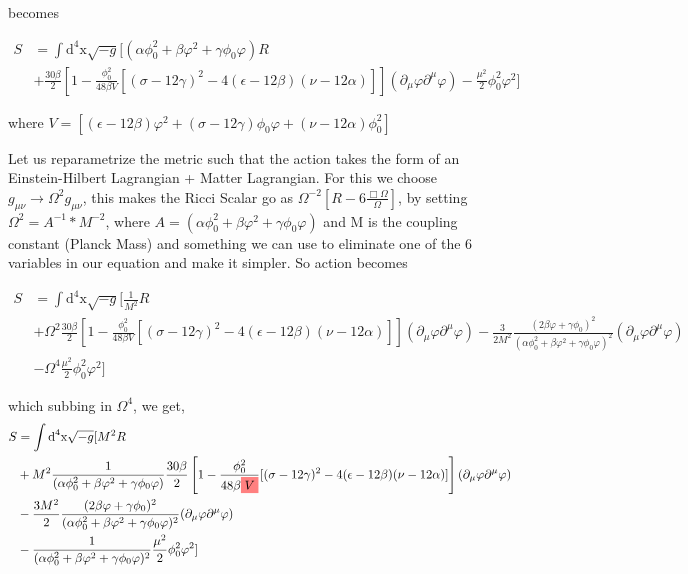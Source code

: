 \documentclass{article}
\newcommand{\highlight}[1]{%
  \colorbox{red!50}{$\displaystyle#1$}}
\begin{document}
becomes

\begin{equation} \label{24}
    \begin{aligned}
        S &= \int \text{d}^4\text{x} \sqrt{-g} [ (\alpha \phi^2_0 + \beta \varphi^2 + \gamma \phi_0 \varphi) R \\
        &+ \frac{30 \beta}{2} \left[ 1 - \frac{\phi_0^2}{48\beta V} [(\sigma - 12\gamma)^2 - 4(\epsilon - 12 \beta)(\nu - 12\alpha) ] \right] (\partial_\mu \varphi \partial^\mu \varphi)- \frac{\mu^2}{2} \phi^2_0 \varphi^2 ] 
    \end{aligned}
\end{equation}

where $V = [(\epsilon - 12\beta) \varphi^2 + (\sigma - 12\gamma) \phi_0 \varphi + (\nu - 12\alpha)\phi^2_0]$

Let us reparametrize the metric such that the action takes the form of an Einstein-Hilbert Lagrangian + Matter Lagrangian. For this we choose $g_{\mu\nu} \rightarrow \Omega^2 g_{\mu\nu} $, this makes the  Ricci Scalar go as $\Omega^{-2} [R - 6\frac{\Box\Omega}{\Omega}]$, by setting $\Omega^2 = A^{-1} * M^{-2}$, where $A = (\alpha \phi^2_0 + \beta \varphi^2 + \gamma \phi_0 \varphi)$ and M is the coupling constant (Planck Mass) and something we can use to eliminate one of the 6 variables in our equation and make it simpler. So action becomes

\begin{equation}
    \begin{aligned}
        S &= \int \text{d}^4\text{x} \sqrt{-g} [ \frac{1}{M^2}  R \\
        &+ \Omega^2 \frac{30 \beta}{2} \left[ 1 - \frac{\phi_0^2}{48\beta V} [(\sigma - 12\gamma)^2 - 4(\epsilon - 12 \beta)(\nu - 12\alpha) ] \right] (\partial_\mu \varphi \partial^\mu \varphi) - \frac{3}{2M^2} \frac{(2\beta \varphi + \gamma \phi_0)^2}{(\alpha \phi^2_0 + \beta \varphi^2 + \gamma \phi_0 \varphi)^2} (\partial_\mu \varphi \partial^\mu \varphi)  \\
        &- \Omega^4 \frac{\mu^2}{2} \phi^2_0 \varphi^2 ] 
    \end{aligned}
\end{equation}

which subbing in $\Omega^4$, we get,
\begin{equation} \label{26}
    \begin{aligned}
        S &= \int \text{d}^4\text{x} \sqrt{-g} [ M^2 R \\
        &+ M^2 \frac{1}{(\alpha \phi^2_0 + \beta \varphi^2 + \gamma \phi_0 \varphi)} \frac{30 \beta}{2} \left[ 1 - \frac{\phi_0^2}{48\beta \highlight{V}} [(\sigma - 12\gamma)^2 - 4(\epsilon - 12 \beta)(\nu - 12\alpha) ] \right] (\partial_\mu \varphi \partial^\mu \varphi)\\ 
        &- \frac{3M^2}{2} \frac{(2\beta \varphi + \gamma \phi_0)^2}{(\alpha \phi^2_0 + \beta \varphi^2 + \gamma \phi_0 \varphi)^2} (\partial_\mu \varphi \partial^\mu \varphi)  \\
        &-  \frac{1}{(\alpha \phi^2_0 + \beta \varphi^2 + \gamma \phi_0 \varphi)^2} \frac{\mu^2}{2} \phi^2_0 \varphi^2 ] 
    \end{aligned}
\end{equation}
\end{document}
